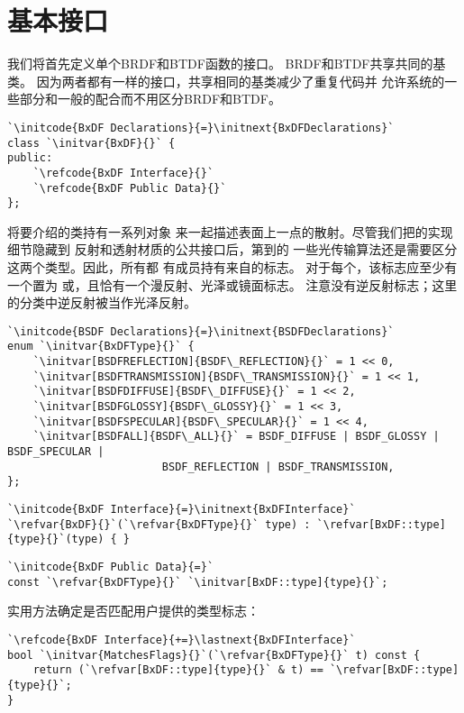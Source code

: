 \section{基本接口}\label{sec:基本接口}
我们将首先定义单个BRDF和BTDF函数的接口。
BRDF和BTDF共享共同的基类。
因为两者都有一样的接口，共享相同的基类减少了重复代码并
允许系统的一些部分和一般的配合而不用区分BRDF和BTDF。
\begin{lstlisting}
`\initcode{BxDF Declarations}{=}\initnext{BxDFDeclarations}`
class `\initvar{BxDF}{}` {
public:
    `\refcode{BxDF Interface}{}`
    `\refcode{BxDF Public Data}{}`
};
\end{lstlisting}

将要介绍的类持有一系列对象
来一起描述表面上一点的散射。尽管我们把的实现细节隐藏到
反射和透射材质的公共接口后，第到的
一些光传输算法还是需要区分这两个类型。因此，所有都
有成员持有来自的标志。
对于每个，该标志应至少有一个置为
或，且恰有一个漫反射、光泽或镜面标志。
注意没有逆反射标志；这里的分类中逆反射被当作光泽反射。

\begin{lstlisting}
`\initcode{BSDF Declarations}{=}\initnext{BSDFDeclarations}`
enum `\initvar{BxDFType}{}` {
    `\initvar[BSDFREFLECTION]{BSDF\_REFLECTION}{}` = 1 << 0,
    `\initvar[BSDFTRANSMISSION]{BSDF\_TRANSMISSION}{}` = 1 << 1,
    `\initvar[BSDFDIFFUSE]{BSDF\_DIFFUSE}{}` = 1 << 2,
    `\initvar[BSDFGLOSSY]{BSDF\_GLOSSY}{}` = 1 << 3,
    `\initvar[BSDFSPECULAR]{BSDF\_SPECULAR}{}` = 1 << 4,
    `\initvar[BSDFALL]{BSDF\_ALL}{}` = BSDF_DIFFUSE | BSDF_GLOSSY | BSDF_SPECULAR |
                        BSDF_REFLECTION | BSDF_TRANSMISSION,
};
\end{lstlisting}

\begin{lstlisting}
`\initcode{BxDF Interface}{=}\initnext{BxDFInterface}`
`\refvar{BxDF}{}`(`\refvar{BxDFType}{}` type) : `\refvar[BxDF::type]{type}{}`(type) { }
\end{lstlisting}

\begin{lstlisting}
`\initcode{BxDF Public Data}{=}`
const `\refvar{BxDFType}{}` `\initvar[BxDF::type]{type}{}`;
\end{lstlisting}

实用方法确定是否匹配用户提供的类型标志：
\begin{lstlisting}
`\refcode{BxDF Interface}{+=}\lastnext{BxDFInterface}`
bool `\initvar{MatchesFlags}{}`(`\refvar{BxDFType}{}` t) const {
    return (`\refvar[BxDF::type]{type}{}` & t) == `\refvar[BxDF::type]{type}{}`;
}
\end{lstlisting}

